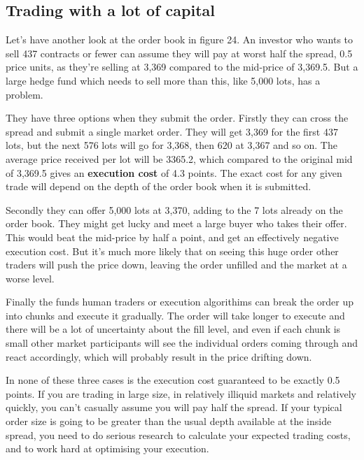 
\subsection*{Trading with a lot of capital}

Let's have another look at the order book in figure 24. An investor who wants to sell 437 contracts or fewer can assume they will pay at worst half the spread, 0.5 price units, as they're selling at 3,369 compared to the mid-price of 3,369.5. But a large hedge fund which needs to sell more than this, like 5,000 lots, has a problem.

They have three options when they submit the order. Firstly they can cross the spread and submit a single market order. They will get 3,369 for the first 437 lots, but the next 576 lots will go for 3,368, then 620 at 3,367 and so on. The average price received per lot will be 3365.2, which compared to the original mid of 3,369.5 gives an \textbf{execution cost} of 4.3 points. The exact cost for any given trade will depend on the depth of the order book when it is submitted.

Secondly they can offer 5,000 lots at 3,370, adding to the 7 lots already on the order book. They might get lucky and meet a large buyer who takes their offer. This would beat the mid-price by half a point, and get an effectively negative execution cost. But it's much more likely that on seeing this huge order other traders will push the price down, leaving the order unfilled and the market at a worse level.

Finally the funds human traders or execution algorithims can break the order up into chunks and execute it gradually. The order will take longer to execute and there will be a lot of uncertainty about the fill level, and even if each chunk is small other market participants will see the individual orders coming through and react accordingly, which will probably result in the price drifting down.

In none of these three cases is the execution cost guaranteed to be exactly 0.5 points. If you are trading in large size, in relatively illiquid markets and relatively quickly, you can't casually assume you will pay half the spread. If your typical order size is going to be greater than the usual depth available at the inside spread, you need to do serious research to calculate your expected trading costs, and to work hard at optimising your execution.

